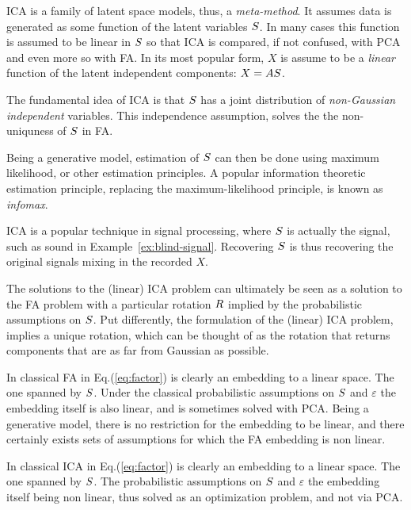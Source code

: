 \documentclass[12pt,a4paper]{article}
\begin{document}
ICA is a family of latent space models, thus, a \emph{meta-method}.
It assumes data is generated as some function of the latent variables $S$. 
In many cases this function is assumed to be linear in $S$ so that ICA is compared, if not confused, with PCA and even more so with FA. 
In its most popular form, $X$ is assume to be a \emph{linear} function of the latent independent components: $X=A S$.

The fundamental idea of ICA is that $S$ has a joint distribution of \emph{non-Gaussian independent} variables. 
This independence assumption, solves the the non-uniquness of $S$ in FA.

Being a generative model, estimation of $S$ can then be done using maximum likelihood, or other estimation principles. 
A popular information theoretic estimation principle, replacing the maximum-likelihood principle, is known as \emph{infomax}.

ICA is a popular technique in signal processing, where $S$ is actually the signal, such as sound in Example~\ref{ex:blind-signal}.
Recovering $S$ is thus recovering the original signals mixing in the recorded $X$. 



\begin{remark}
	The solutions to the (linear) ICA problem can ultimately be seen as a solution to the FA problem with a particular rotation $R$ implied by the probabilistic assumptions on $S$.
	Put differently, the formulation of the (linear) ICA problem, implies a unique rotation, which can be thought of as the rotation that returns components that are as far from Gaussian as possible. 
\end{remark}


\begin{remark}
	In classical FA in Eq.(\ref{eq:factor}) is clearly an embedding to a linear space. 
	The one spanned by $S$. 
	Under the classical probabilistic assumptions on $S$ and $\varepsilon$ the embedding itself is also linear, and is sometimes solved with PCA. 
	Being a generative model, there is no restriction for the embedding to be linear, and there certainly exists sets of assumptions for which the FA embedding is non linear. 
\end{remark}


\begin{remark}
	In classical ICA in Eq.(\ref{eq:factor}) is clearly an embedding to a linear space. 
	The one spanned by $S$. 
	The probabilistic assumptions on $S$ and $\varepsilon$ the embedding itself being non linear, thus solved as an optimization problem, and not via PCA. 
\end{remark}
\end{document}
